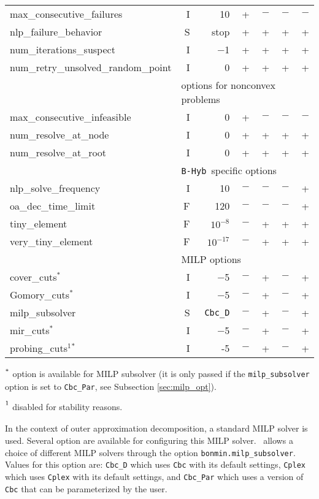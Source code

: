 {\begin{latexonly}
\begin{threeparttable}
\begin{tabular}{|l|r|r|r|r|r|r|}
max\_consecutive\_failures & I & 10 & + & $-$ & $-$ & $-$\\
nlp\_failure\_behavior & S & stop   & + & + & + & + \\
num\_iterations\_suspect & I & $-$1 & + & + & + & + \\
num\_retry\_unsolved\_random\_point & I & 0 & + & + & + & + \\
\hline
\multicolumn{1}{|c}{} & \multicolumn{6}{l|}{options for nonconvex problems}\\
\hline
max\_consecutive\_infeasible & I & 0 & + & $-$ & $-$ & $-$\\
num\_resolve\_at\_node & I & 0 & + & +  & + & + \\
num\_resolve\_at\_root & I & 0& + & + & + & +  \\
\hline
\multicolumn{1}{|c}{} & \multicolumn{6}{l|}{{\tt B-Hyb }specific options}\\
\hline
nlp\_solve\_frequency & I & 10 & $-$ & $-$ & $-$ & +\\
oa\_dec\_time\_limit & F& 120 & $-$ & $-$ & $-$ & +\\
tiny\_element & F & $10^{-8}$ & $-$ & + & + & + \\
very\_tiny\_element & F & $10^{-17}$ & $-$ & + & + & + \\
\hline
\multicolumn{1}{|c}{} & \multicolumn{6}{l|}{MILP options}\\
\hline
cover\_cuts$^*$  & I & $-$5 & $-$ & + & $-$ & +\\
Gomory\_cuts$^*$ & I & $-$5 & $-$ &  + & $-$ & + \\
milp\_subsolver &S & {\tt Cbc\_D} & $-$ & + & $-$ & + \\
mir\_cuts$^*$  & I & $-$5 & $-$  & + & $-$ &+\\
probing\_cuts$^1$$^*$  & I & -5 & $-$ & + & $-$ & +\\
\hline
\end{tabular}
\begin{tablenotes}
\item $\strut^*$ option is available
         for MILP subsolver (it is only passed if the {\tt milp\_subsolver} option is set to {\tt Cbc\_Par},
         see Subsection \ref{sec:milp_opt}).
\item $\strut^1$ disabled for stability reasons.
\end{tablenotes}
\end{threeparttable}
\end{latexonly}
}{
}

\label{sec:milp_opt}
In the context of outer approximation decomposition, a standard MILP solver is used.
Several option are available for configuring this MILP solver.
\Bonmin\ allows a choice of different MILP solvers through the option
{\tt bonmin.milp\_subsolver}. Values for this option are: {\tt Cbc\_D} which uses {\tt Cbc} with its
default settings, {\tt Cplex} which uses {\tt Cplex} with its default settings, and
{\tt Cbc\_Par} which uses a version of {\tt Cbc} that can be parameterized by the user.

